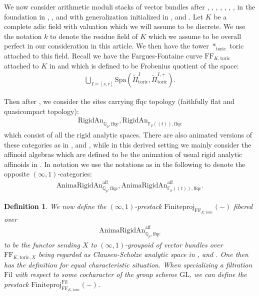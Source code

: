 \documentclass[12pt]{article}
\newtheorem{definition}{Definition}
\begin{document}
\indent We now consider arithmetic moduli stacks of vector bundles after \cite{Dr}, \cite{Dr1}, \cite{Dr2}, \cite{He1}, \cite{PR}, \cite{EG}, \cite{EGH}, \cite{HHS} in the foundation in \cite{HP}, \cite{FF}, \cite{KL1} and \cite{KL2} with generalization initialized in \cite{KP}, \cite{T1} and \cite{T2}. Let $K$ be a complete adic field with valuation which we will assume to be discrete. We use the notation $k$ to denote the residue field of $K$ which we assume to be overall perfect in our consideration in this article. We then have the tower $*_{\mathrm{toric}}$ toric attached to this field. Recall we have the Fargues-Fontaine curve $\mathrm{FF}_{K,\mathrm{toric}}$ attached to $K$ in \cite{KL1} and \cite{KL2} which is defined to be Frobenius quotient of the space:
\begin{align}
\bigcup_{I=[s,r]}\mathrm{Spa}(\widetilde{\Pi}^I_{\mathrm{toric}},\widetilde{\Pi}_{\mathrm{toric}}^{I,+}).	
\end{align}

Then after \cite{W}, \cite{He1} we consider the sites carrying ffqc topology (faithfully flat and quasicompact topology):
\begin{align}
\mathrm{RigidAn}_{\mathbb{Q}_p,\mathrm{ffqc}},\mathrm{RigidAn}_{\mathbb{F}_p((t)),\mathrm{ffqc}}	
\end{align}
which consist of all the rigid analytic spaces. There are also animated versions of these categories as in \cite{CS1}, \cite{CS2} and \cite{CS3}, while in this derived setting we mainly consider the affinoid algebras which are defined to be the animation of usual rigid analytic affinoids in \cite{Ta}. In notation we use the notations as in the following to denote the opposite $(\infty,1)$-categories:
\begin{align}
\mathrm{AnimaRigidAn}^\mathrm{aff}_{\mathbb{Q}_p,\mathrm{ffqc}},\mathrm{AnimaRigidAn}^\mathrm{aff}_{\mathbb{F}_p((t)),\mathrm{ffqc}}.	
\end{align}

\begin{definition}
We now define the $(\infty,1)$-prestack $\mathrm{Finiteproj}_{\mathrm{FF}_{K,\mathrm{toric}}}(-)$ fibered over 
\begin{align}
\mathrm{AnimaRigidAn}^\mathrm{aff}_{\mathbb{Q}_p,\mathrm{ffqc}}
\end{align}
to be the functor sending $X$ to $(\infty,1)$-groupoid of vector bundles over $\mathrm{FF}_{K,\mathrm{toric},X}$ being regarded as Clausen-Scholze analytic space in \cite{CS1}, \cite{CS2} and \cite{CS3}. One then has the definition for equal characteristic situation. When specializing a filtration $\mathrm{Fil}$ with respect to some cocharacter of the group scheme $\mathrm{GL}$, we can define the prestack $\mathrm{Finiteproj}^{\mathrm{Fil}}_{\mathrm{FF}_{K,\mathrm{toric}}}(-)$.
\end{definition}
\end{document}

